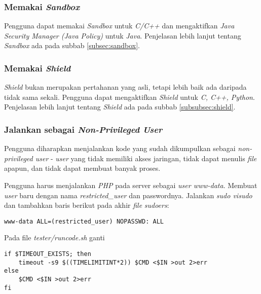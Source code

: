 \subsubsection{Memakai \textit{Sandbox}}
\label{subsubsec:memakai_sandbox}
Pengguna dapat memakai \textit{Sandbox} untuk \textit{C/C++} dan mengaktifkan \textit{Java Security Manager (Java Policy)} untuk \textit{Java}. Penjelasan lebih lanjut tentang \textit{Sandbox} ada pada subbab \ref{subsec:sandbox}.

\subsubsection{Memakai \textit{Shield}}
\label{subsubsec:memakai_shield}
\textit{Shield} bukan merupakan pertahanan yang asli, tetapi lebih baik ada daripada tidak sama sekali. Pengguna dapat mengaktifkan \textit{Shield} untuk \textit{C, C++, Python}. Penjelasan lebih lanjut tentang \textit{Shield} ada pada subbab \ref{subsubsec:shield}.

\subsubsection{Jalankan sebagai \textit{Non-Privileged User}}
\label{subsubsec:non_prileged_user}
Pengguna diharapkan menjalankan kode yang sudah dikumpulkan sebagai \textit{non-privileged user} - \textit{user} yang tidak memiliki akses jaringan, tidak dapat menulis \textit{file} apapun, dan tidak dapat membuat banyak proses.

Pengguna harus menjalankan \textit{PHP} pada server sebagai \textit{user www-data}. Membuat \textit{user} baru dengan nama \textit{restricted\_user} dan passwordnya. Jalankan \textit{sudo visudo} dan tambahkan baris berikut pada akhir \textit{file} \textit{sudoers}:

\begin{lstlisting}[basicstyle=\ttfamily, frame=single,
columns=fullflexible, keepspaces=true, breaklines=true, label=ls:13]
www-data ALL=(restricted_user) NOPASSWD: ALL
\end{lstlisting}

Pada file \textit{tester/runcode.sh} ganti 

\begin{lstlisting}[basicstyle=\ttfamily, frame=single,
columns=fullflexible, keepspaces=true, breaklines=true, label=ls:14]
if $TIMEOUT_EXISTS; then
	timeout -s9 $((TIMELIMITINT*2)) $CMD <$IN >out 2>err
else
	$CMD <$IN >out 2>err        
fi
\end{lstlisting}

